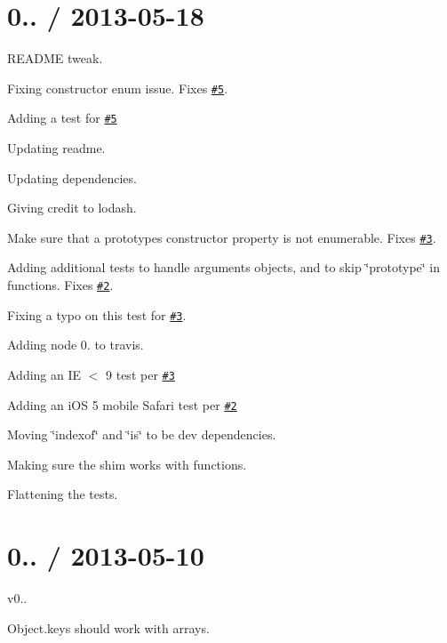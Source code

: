 \section*{0.. / 2013-\/05-\/18 }


\begin{DoxyItemize}
\item R\+E\+A\+D\+ME tweak.
\item Fixing constructor enum issue. Fixes \href{https://github.com/ljharb/object-keys/issues/5}{\tt \#5}.
\item Adding a test for \href{https://github.com/ljharb/object-keys/issues/5}{\tt \#5}
\item Updating readme.
\item Updating dependencies.
\item Giving credit to lodash.
\item Make sure that a prototype\textquotesingle{}s constructor property is not enumerable. Fixes \href{https://github.com/ljharb/object-keys/issues/3}{\tt \#3}.
\item Adding additional tests to handle arguments objects, and to skip \char`\"{}prototype\char`\"{} in functions. Fixes \href{https://github.com/ljharb/object-keys/issues/2}{\tt \#2}.
\item Fixing a typo on this test for \href{https://github.com/ljharb/object-keys/issues/3}{\tt \#3}.
\item Adding node 0. to travis.
\item Adding an IE $<$ 9 test per \href{https://github.com/ljharb/object-keys/issues/3}{\tt \#3}
\item Adding an i\+OS 5 mobile Safari test per \href{https://github.com/ljharb/object-keys/issues/2}{\tt \#2}
\item Moving \char`\"{}indexof\char`\"{} and \char`\"{}is\char`\"{} to be dev dependencies.
\item Making sure the shim works with functions.
\item Flattening the tests.
\end{DoxyItemize}

\section*{0.. / 2013-\/05-\/10 }


\begin{DoxyItemize}
\item v0..
\item Object.\+keys should work with arrays.
\end{DoxyItemize}

